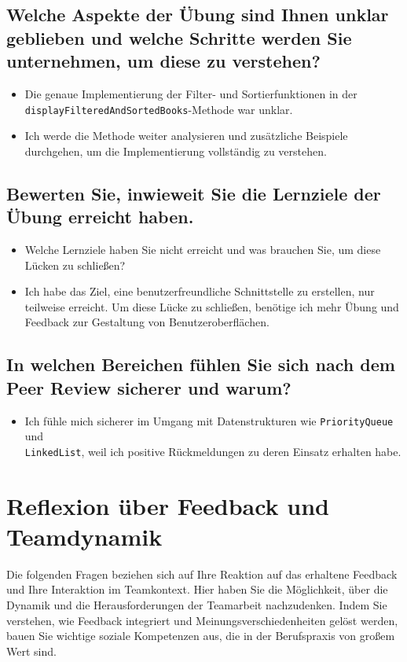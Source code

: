 \documentclass[a4paper,11pt]{article}
\begin{document}
\subsection*{Welche Aspekte der Übung sind Ihnen unklar geblieben und welche Schritte werden Sie unternehmen, um diese zu verstehen?}
\begin{itemize}
    \item Die genaue Implementierung der Filter- und Sortierfunktionen in der
          \\ \texttt{displayFilteredAndSortedBooks}-Methode war unklar.
    \item Ich werde die Methode weiter analysieren und zusätzliche Beispiele durchgehen, um die Implementierung vollständig zu verstehen.
\end{itemize}

\subsection*{Bewerten Sie, inwieweit Sie die Lernziele der Übung erreicht haben.}
\begin{itemize}
    \item Welche Lernziele haben Sie nicht erreicht und was brauchen Sie, um diese Lücken zu schließen?
    \item Ich habe das Ziel, eine benutzerfreundliche Schnittstelle zu erstellen, nur teilweise erreicht. Um diese Lücke zu schließen, benötige ich mehr Übung und Feedback zur Gestaltung von Benutzeroberflächen.
\end{itemize}

\subsection*{In welchen Bereichen fühlen Sie sich nach dem Peer Review sicherer und warum?}
\begin{itemize}
    \item Ich fühle mich sicherer im Umgang mit Datenstrukturen wie \texttt{PriorityQueue} und
          \\ \texttt{LinkedList}, weil ich positive Rückmeldungen zu deren Einsatz erhalten habe.
\end{itemize}

\section*{Reflexion über Feedback und Teamdynamik}

Die folgenden Fragen beziehen sich auf Ihre Reaktion auf das erhaltene Feedback und Ihre Interaktion im Teamkontext. Hier haben Sie die Möglichkeit, über die Dynamik und die Herausforderungen der Teamarbeit nachzudenken. Indem Sie verstehen, wie Feedback integriert und Meinungsverschiedenheiten gelöst werden, bauen Sie wichtige soziale Kompetenzen aus, die in der Berufspraxis von großem Wert sind.
\end{document}
